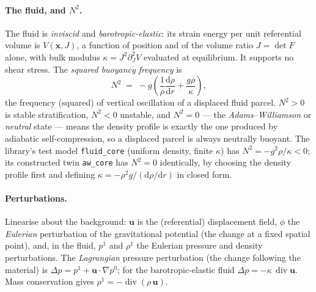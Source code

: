 \documentclass[11pt]{article}
\newcommand{\bu}{\mathbf{u}}
\newcommand{\Div}{\operatorname{div}}
\newcommand{\code}[1]{\texttt{#1}}
\begin{document}
\paragraph{The fluid, and $N^2$.} The fluid is \emph{inviscid} and
\emph{barotropic-elastic}: its strain energy per unit referential
volume is $V(\mathbf{x}, J)$, a function of position and of the
volume ratio $J = \det F$ alone, with bulk modulus
$\kappa = J^2 \partial^2_J V$ evaluated at equilibrium. It supports
no shear stress. The \emph{squared buoyancy frequency} is
\begin{equation}
  N^2 \;=\; -g\left(\frac{1}{\rho}\frac{\mathrm{d}\rho}{\mathrm{d}r}
            + \frac{g\rho}{\kappa}\right),
  \label{eq:N2}
\end{equation}
the frequency (squared) of vertical oscillation of a displaced fluid
parcel. $N^2 > 0$ is stable stratification, $N^2 < 0$ unstable, and
$N^2 = 0$ --- the \emph{Adams--Williamson} or \emph{neutral} state ---
means the density profile is exactly the one produced by adiabatic
self-compression, so a displaced parcel is always neutrally buoyant.
The library's test model \code{fluid\_core} (uniform density,
finite $\kappa$) has $N^2 = -g^2\rho/\kappa < 0$; its constructed
twin \code{aw\_core} has $N^2 = 0$ identically, by choosing the
density profile first and defining
$\kappa = -\rho^2 g / (\mathrm{d}\rho/\mathrm{d}r)$ in closed form.

\paragraph{Perturbations.} Linearise about the background:
$\bu$ is the (referential) displacement field, $\phi$ the
\emph{Eulerian} perturbation of the gravitational potential (the
change at a fixed spatial point), and, in the fluid,
$p^1$ and $\rho^1$ the Eulerian pressure and density perturbations.
The \emph{Lagrangian} pressure perturbation (the change following the
material) is $\Delta p = p^1 + \bu\cdot\nabla p^0$; for the
barotropic-elastic fluid $\Delta p = -\kappa\,\Div\bu$. Mass
conservation gives $\rho^1 = -\Div(\rho\,\bu)$.
\end{document}
